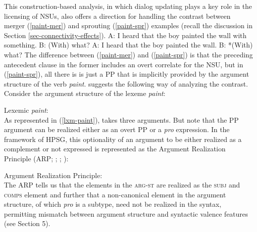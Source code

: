{This construction-based analysis, in which dialog updating plays
a key role in the licensing of NSUs, also offers a direction
for handling the contrast between merger (\ref{paint-mer}) and sprouting (\ref{paint-spr}) examples (recall the discussion in Section \ref{sec-connectivity-effects}). %
%
\eal
\ex A: I heard that the boy painted the wall with something. B: (With) what?  
\label{paint-mer}
\ex A: I heard that the boy painted the wall. B: *(With) what? \label{paint-spr}
\zl
%
The difference between (\ref{paint-mer}) and (\ref{paint-spr})  is that the preceding antecedent clause in the
former includes an overt correlate for the NSU, but in (\ref{paint-spr}), 
all there is is just a PP that is implicitly provided
by the argument structure 
of the verb \textit{paint}.
%
\citet{Kim2015} suggests the following way of analyzing the contrast. Consider the argument structure of the lexeme \textit{paint}:

\ea
\label{lxm-paint}
Lexemic \textit{paint}:\\
\z
%
%
As represented in (\ref{lxm-paint}),
\citet{Kim2015} takes three arguments. But
note that the PP argument can be realized
either as an overt PP or a \textit{pro} expression. In the framework of HPSG, this optionality of an argument to be either realized as a complement or not expressed is represented as the Argument Realization Principle  (ARP; \citealt[171]{Ginzburg:Sag:2000}; \citealt[11]{Bouma:Malouf:Sag:01}; \crossrefchapteralt[\page \pageref{page-argument-realization-principle}]{properties}):
%

\ea
\label{arp}
Argument Realization Principle:\\
 \impl
{}
\z
The ARP tells us that the elements in the \textsc{arg-st} are realized as the \textsc{subj} and
\textsc{comps} element and further that a non-canonical  element in the argument structure, of which \textit{pro} is a subtype, need not be realized in the syntax, permitting mismatch between argument structure and syntactic valence features (see Section 5). 

}
